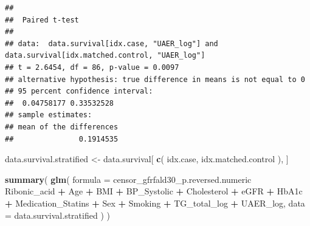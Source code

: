 \documentclass[]{article}
\newenvironment{Shaded}{\begin{snugshade}}{\end{snugshade}}
\newcommand{\DataTypeTok}[1]{\textcolor[rgb]{0.13,0.29,0.53}{#1}}
\newcommand{\KeywordTok}[1]{\textcolor[rgb]{0.13,0.29,0.53}{\textbf{#1}}}
\newcommand{\NormalTok}[1]{#1}
\newcommand{\OperatorTok}[1]{\textcolor[rgb]{0.81,0.36,0.00}{\textbf{#1}}}
\newcommand{\StringTok}[1]{\textcolor[rgb]{0.31,0.60,0.02}{#1}}
\begin{document}
\begin{verbatim}
## 
##  Paired t-test
## 
## data:  data.survival[idx.case, "UAER_log"] and data.survival[idx.matched.control, "UAER_log"]
## t = 2.6454, df = 86, p-value = 0.0097
## alternative hypothesis: true difference in means is not equal to 0
## 95 percent confidence interval:
##  0.04758177 0.33532528
## sample estimates:
## mean of the differences 
##               0.1914535
\end{verbatim}

\begin{Shaded}
\begin{Highlighting}[]
\NormalTok{data.survival.stratified <-}\StringTok{ }\NormalTok{data.survival[ }\KeywordTok{c}\NormalTok{( idx.case, idx.matched.control ), ]}

\KeywordTok{summary}\NormalTok{(}
  \KeywordTok{glm}\NormalTok{(}
    \DataTypeTok{formula =}
\NormalTok{      censor_gfrfald30_p.reversed.numeric }\OperatorTok{~}\StringTok{ }
\StringTok{      }\NormalTok{Ribonic_acid }\OperatorTok{+}\StringTok{ }
\StringTok{      }\NormalTok{Age }\OperatorTok{+}
\StringTok{      }\NormalTok{BMI }\OperatorTok{+}\StringTok{ }
\StringTok{      }\NormalTok{BP_Systolic }\OperatorTok{+}\StringTok{ }
\StringTok{      }\NormalTok{Cholesterol }\OperatorTok{+}\StringTok{ }
\StringTok{      }\NormalTok{eGFR }\OperatorTok{+}\StringTok{ }
\StringTok{      }\NormalTok{HbA1c }\OperatorTok{+}
\StringTok{      }\NormalTok{Medication_Statins }\OperatorTok{+}
\StringTok{      }\NormalTok{Sex }\OperatorTok{+}\StringTok{  }
\StringTok{      }\NormalTok{Smoking }\OperatorTok{+}\StringTok{ }
\StringTok{      }\NormalTok{TG_total_log }\OperatorTok{+}
\StringTok{      }\NormalTok{UAER_log, }
    \DataTypeTok{data =}\NormalTok{ data.survival.stratified}
\NormalTok{  )}
\NormalTok{)}
\end{Highlighting}
\end{Shaded}
\end{document}
